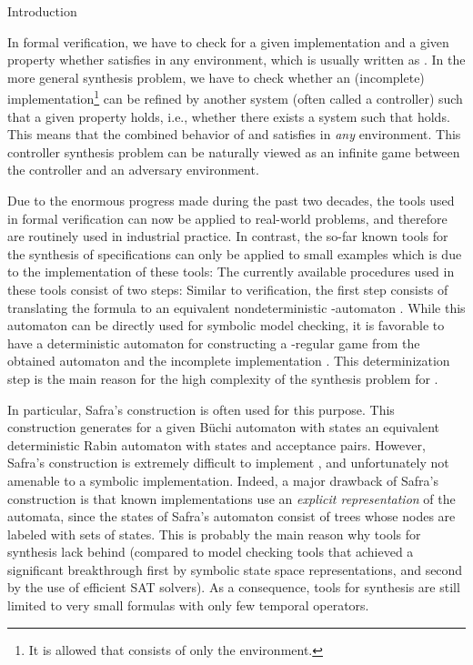 \documentclass[copyright,creativecommons]{eptcs}
\begin{document}
\begin{section}{Introduction}

In formal verification, we have to check for a given implementation  and a given  property  whether  satisfies  in any environment, which is usually written as . In the more general synthesis problem, we have to check whether an (incomplete) implementation\footnote{It is allowed that  consists of only the environment.}  can be refined by another system (often called a controller)  such that a given property  holds, i.e., whether there exists a system  such that  holds. This means that the combined behavior of  and  satisfies  in \emph{any} environment. This controller synthesis problem can be naturally viewed as an infinite game between the controller and an adversary environment.

Due to the enormous progress made during the past two decades, the tools used in formal verification can now be applied to real-world problems, and therefore are routinely used in industrial practice. In contrast, the so-far known tools for the synthesis of  specifications can only be applied to small examples which is due to the implementation of these tools: The currently available procedures used in these tools consist of two steps: Similar to verification, the first step consists of translating the  formula  to an equivalent nondeterministic -automaton . While this automaton  can be directly used for symbolic model checking, it is favorable to have a deterministic automaton for constructing a -regular game from the obtained automaton  and the incomplete implementation . This determinization step is the main reason for the high complexity of the synthesis problem for .

In particular, Safra's construction \cite{Safr88} is often used for this purpose. This construction generates for a given Büchi automaton with  states an equivalent deterministic Rabin automaton with  states and  acceptance pairs. However, Safra's construction is extremely difficult to implement \cite{KlBa06}, and unfortunately not amenable to a symbolic implementation. Indeed, a major drawback of Safra's construction is that known implementations use an \emph{explicit representation} of the automata, since the states of Safra's automaton consist of trees whose nodes are labeled with sets of states. This is probably the main reason why tools for synthesis lack behind (compared to model checking tools that achieved a significant breakthrough first by symbolic state space representations, and second by the use of efficient SAT solvers). As a consequence, tools for  synthesis are still limited to very small formulas with only few temporal operators.


\end{section}
\end{document}
